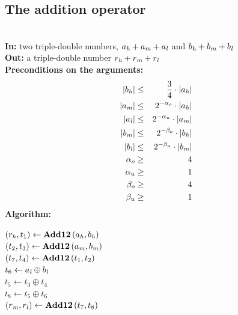 \subsection{The addition operator \AddTT}
\begin{algorithm}[\AddTT] \label{addTTref} ~ \\
{\bf In:} two triple-double numbers, $a_{\mathit{h}} + a_{\mathit{m}} + a_{\mathit{l}}$ and $b_{\mathit{h}} + b_{\mathit{m}} + b_{\mathit{l}}$ \\
{\bf Out:} a triple-double number $r_{\mathit{h}} + r_{\mathit{m}} + r_{\mathit{l}}$ \\
{\bf Preconditions on the arguments:}
\begin{eqnarray*}
\left \vert b_{\mathit{h}} \right \vert & \leq & \frac{3}{4} \cdot \left \vert a_{\mathit{h}} \right \vert \\
\left \vert a_{\mathit{m}} \right \vert & \leq & 2^{-\alpha_o} \cdot \left \vert a_{\mathit{h}} \right \vert \\
\left \vert a_{\mathit{l}} \right \vert & \leq & 2^{-\alpha_u} \cdot \left \vert a_{\mathit{m}} \right \vert \\
\left \vert b_{\mathit{m}} \right \vert & \leq & 2^{-\beta_o} \cdot \left \vert b_{\mathit{h}} \right \vert \\
\left \vert b_{\mathit{l}} \right \vert & \leq & 2^{-\beta_u} \cdot \left \vert b_{\mathit{m}} \right \vert \\
\alpha_o & \geq & 4 \\
\alpha_u & \geq & 1 \\
\beta_o & \geq & 4 \\
\beta_u & \geq & 1 \\
\end{eqnarray*}
{\bf Algorithm:} \\
\begin{center}
\begin{minipage}[b]{50mm}
$\left(r_{\mathit{h}}, t_1 \right) \gets \mathbf{Add12}\left( a_{\mathit{h}}, b_{\mathit{h}} \right)$ \\
$\left(t_2, t_3 \right) \gets \mathbf{Add12}\left( a_{\mathit{m}}, b_{\mathit{m}} \right)$ \\
$\left(t_7, t_4 \right) \gets \mathbf{Add12}\left( t_1, t_2 \right)$ \\
$t_6 \gets a_{\mathit{l}} \oplus b_{\mathit{l}}$ \\
$t_5 \gets t_3 \oplus t_4$ \\
$t_8 \gets t_5 \oplus t_6$ \\
$\left( r_{\mathit{m}}, r_{\mathit{l}} \right) \gets \mathbf{Add12}\left( t_7, t_8 \right)$
\end{minipage}
\end{center}
\end{algorithm}
